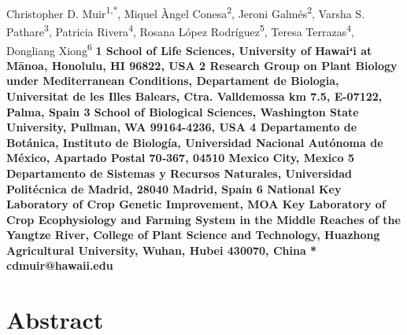 \documentclass[
  10pt,
]{article}
\author{}
\date{\vspace{-2.5em}}
\makeatletter
\newcommand\iraggedright{%
  \let\\\@centercr\@rightskip\@flushglue \rightskip\@rightskip
  \leftskip\z@skip}
\makeatother
\begin{document}
\iraggedright

\begin{flushleft}
{\Large
\textbf{}
}
\newline
\\
Christopher D. Muir\textsuperscript{1,*},
Miquel \`{A}ngel Conesa\textsuperscript{2},
Jeroni Galm\'{e}s\textsuperscript{2},
Varsha S. Pathare\textsuperscript{3},
Patricia Rivera\textsuperscript{4},
Rosana López Rodríguez\textsuperscript{5},
Teresa Terrazas\textsuperscript{4},
Dongliang Xiong\textsuperscript{6}
\\
\bigskip
\bf{1} School of Life Sciences, University of Hawaiʻi at M\=anoa, Honolulu, HI 96822, USA \\
\bf{2} Research Group on Plant Biology under Mediterranean Conditions, Departament de Biologia, Universitat de les Illes Balears, Ctra. Valldemossa km 7.5, E-07122, Palma, Spain \\
\bf{3} School of Biological Sciences, Washington State University, Pullman, WA 99164-4236, USA \\
\bf{4} Departamento de Botánica, Instituto de Biología, Universidad Nacional Autónoma de México, Apartado Postal 70‑367, 04510 Mexico City, Mexico \\
\bf{5} Departamento de Sistemas y Recursos Naturales, Universidad Politécnica de Madrid, 28040 Madrid, Spain \\
\bf{6} National Key Laboratory of Crop Genetic Improvement, MOA Key Laboratory of Crop Ecophysiology and Farming System in the Middle Reaches of the Yangtze River, College of Plant Science and Technology, Huazhong Agricultural University, Wuhan, Hubei 430070, China\\
\bigskip
* cdmuir@hawaii.edu

\end{flushleft}

\hypertarget{abstract}{%
\section{Abstract}\label{abstract}}
\end{document}
